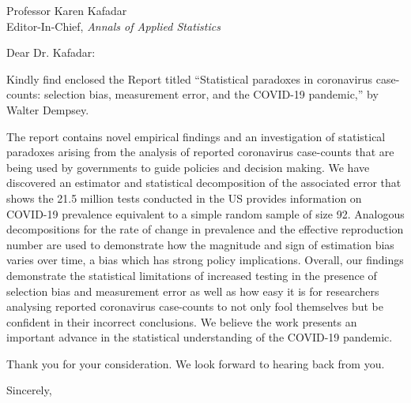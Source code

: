 \documentclass[10pt]{letter} %
\begin{document}

\begin{letter}{Professor Karen Kafadar \\
    Editor-In-Chief, {\em Annals of Applied Statistics}
         }


\signature{Walter Dempsey\\
University of Michigan \\
Department of Biostatistics\\
M4057 SPH II \\
1415 Washington Heights \\
wdem@umich.edu} %


\date\today

\opening{Dear Dr. Kafadar:}

Kindly find enclosed the Report titled ``Statistical paradoxes in coronavirus case-counts: selection bias, measurement error, and the COVID-19 pandemic,'' by Walter Dempsey.

The report contains novel empirical findings and an investigation of statistical paradoxes arising from the analysis of reported coronavirus case-counts that are being used by governments to guide policies and decision making. We have discovered an estimator and statistical decomposition of the associated error that shows the 21.5 million tests conducted in the US provides information on COVID-19 prevalence equivalent to a simple random sample of size 92. Analogous decompositions for the rate of change in prevalence and the effective reproduction number are used to demonstrate how the magnitude and sign of estimation bias varies over time, a bias which has strong policy implications. Overall, our findings demonstrate the statistical limitations of increased testing in the presence of selection bias and measurement error as well as how easy it is for researchers analysing reported coronavirus case-counts to not only fool themselves but be confident in their incorrect conclusions. We believe the work presents an important advance in the statistical understanding of the COVID-19 pandemic.

Thank you for your consideration. We look forward to hearing back from you.

\closing{Sincerely,}


\end{letter}
\end{document}

